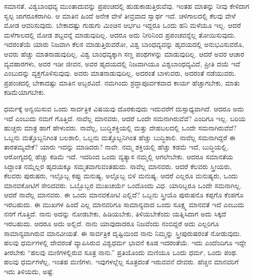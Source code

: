 \vskip 0.2cm

ಸಮಾನತೆ, ವಿಶ್ವಬಾಂಧವ್ಯ ಮುಂತಾದುವನ್ನು ಪ್ರಪಂಚದಲ್ಲಿ ಹುಡುಕಾಡುತ್ತಿರುವೆವು. ಇಂತಹ ಮಾತನ್ನು ನೀವು ಕೇಳಿದಾಗ ಸ್ವಲ್ಪ ಜಾಗರೂಕರಾಗಿರಿ. ಆ ಮಾತಿನ ಹಿಂದೆ ಅನೇಕ ವೇಳೆ ತೀವ್ರವಾದ ಸ್ವಾರ್ಥ ಇದೆ. ಚಳಿಗಾಲದಲ್ಲಿ ಕೆಲವು ವೇಳೆ ಮೋಡ ಆವರಿಸುವುದು. ಬೇಕಾದಷ್ಟು ಗುಡುಗು ಮಿಂಚಿನ ಆರ್ಭಟ ಇದ್ದರೂ ಒಂದು ಹನಿ ಮಳೆಯೂ ಇಲ್ಲ. ಆದರೆ ಮಳೆಗಾಲದಲ್ಲಿ ಮೋಡ ಶಬ್ದವನ್ನೆ ಮಾಡುವುದಿಲ್ಲ. ಆದರೂ ಅದು ನೀರಿನಿಂದ ಪ್ರಪಂಚವನ್ನೆಲ್ಲ ತೋಯಿಸುವುದು. ಇದರಂತೆಯೆ ಯಾರು ನಿಜವಾಗಿ ಕೆಲಸ ಮಾಡುತ್ತಿರುವರೋ, ವಿಶ್ವ ಬಾಂಧವ್ಯವನ್ನು ಹೃದಯದಲ್ಲಿ ಅನುಭವಿಸುವರೊ, ಅವರು ಹೆಚ್ಚು ಮಾತನಾಡುವುದಿಲ್ಲ. ವಿಶ್ವ ಬಾಂಧವ್ಯಕ್ಕಾಗಿ ಸಣ್ಣ ಪಂಥಗಳನ್ನು ಮಾಡುವುದಿಲ್ಲ. ಆದರೆ ಅವರ ಆಚಾರ ವ್ಯವಹಾರಗಳು, ಅವರ ಇಡೀ ಜೀವನ, ಅವರ ಹೃದಯದಲ್ಲಿ ನಿಜವಾಗಿಯೂ ವಿಶ್ವಬಾಂಧವ್ಯವಿದೆ, ಪ್ರೀತಿ ದಯೆ ಇವೆ ಎಂಬುದನ್ನು ವ್ಯಕ್ತಗೊಳಿಸುವುವು. ಅವರು ಮಾತನಾಡುವುದಿಲ್ಲ, ಅದರಂತೆ ಬಾಳುವರು, ಅದರಂತೆ ನಡೆಯುವರು. ಪ್ರಪಂಚದಲ್ಲಿ ಬೇಕಾದಷ್ಟು ಮಾತಿನ ಅಬ್ಬರವಿದೆ. ನಮಗಿಂದು ಶ್ರದ್ಧಾಪೂರ್ವಕವಾದ ಕಾರ್ಯ ಹೆಚ್ಚಾಗಬೇಕು, ಮಾತು ಕಡಿಮೆಯಾಗಬೇಕು.

\vskip 0.2cm

ಧರ್ಮಕ್ಕೆ ಅನ್ವಯಿಸುವ ಒಂದು ಸಾರ್ವತ್ರಿಕ ವಿಷಯವು ದೊರಕುವುದು ಇದುವರೆಗೆ ದುಸ್ಸಾಧ್ಯವಾಗಿದೆ. ಆದರೂ ಅದು ಇದೆ ಎಂಬುದು ನಮಗೆ ಗೊತ್ತಿದೆ. ನಾವೆಲ್ಲ ಮಾನವರು, ಆದರೆ ಒಂದೇ ಸಮನಾಗಿರುವೆವೆ? ಎಂದಿಗೂ ಇಲ್ಲ. ಬರಿಯ ಹುಚ್ಚರು ಮಾತ್ರ ಹಾಗೆ ಹೇಳುವರು. ನಾವೆಲ್ಲ, ಬುದ್ಧಿಶಕ್ತಿಯಲ್ಲಿ ಮತ್ತು ದೇಹಬಲದಲ್ಲಿ ಒಂದೇ ಸಮನಾಗಿರುವೆವೆ? ಒಬ್ಬನು ಮತ್ತೊಬ್ಬನಿಗಿಂತ ಬಲಶಾಲಿ, ಒಬ್ಬನು ಮತ್ತೊಬ್ಬನಿಗಿಂತ ಹೆಚ್ಚು ಬುದ್ಧಿಶಾಲಿ. ನಾವೆಲ್ಲ ಸಮನಾಗಿದ್ದರೆ ಈ ತಾರತಮ್ಯವೇಕೆ? ಯಾರು ಇದನ್ನು ಮಾಡಿದರು? ನಾವೇ. ನಮ್ಮ ಶಕ್ತಿಯಲ್ಲಿ ಹೆಚ್ಚು ಕಡಮೆ ಇದೆ, ಬುದ್ಧಿಯಲ್ಲಿ, ಆರೋಗ್ಯದಲ್ಲಿ ಹೆಚ್ಚು ಕಡಿಮೆ ಇದೆ. ಇದರಿಂದ ಒಂದು ವ್ಯತ್ಯಾಸ ನಮ್ಮಲ್ಲಿ ಆಗಲೇಬೇಕು. ಆದರೂ ಸಮಾನತೆಯ ಸಿದ್ಧಾಂತ ನಮ್ಮೆಲ್ಲರ ಹೃದಯಕ್ಕೂ ಸಮ್ಮತವಾಗುವಂತಹುದು. ನಾವೆಲ್ಲ ಮಾನವರು. ಆದರೆ ಕೆಲವರು ಸ್ತ್ರೀಯರು, ಕೆಲವರು ಪುರುಷರು, ಇಲ್ಲೊಬ್ಬ ಕಪ್ಪು ಮನುಷ್ಯ, ಅಲ್ಲೊಬ್ಬ ಬಿಳಿ ಮನುಷ್ಯ. ಆದರೆ ಎಲ್ಲರೂ ಮನುಷ್ಯರು, ಒಂದು ಮಾನವಕೋಟಿಗೆ ಸೇರಿದವರು. ಒಬ್ಬೊಬ್ಬರ ಮುಖಚರ್ಯೆ ಒಂದೊಂದು ವಿಧ. ಯಾರಿಬ್ಬರೂ ಒಂದೇ ಸಮನಾಗಿಲ್ಲ. ಆದರೆ ನಾವೆಲ್ಲ ಮಾನವರು. ಈ ಒಂದು ಮಾನವಕೋಟಿ ಎಲ್ಲಿದೆ? ಒಬ್ಬನು ಸ್ತ್ರೀಯೊ ಪುರುಷನೊ ಕಪ್ಪಗೊ ಕೆಂಪಗೊ ಇರಬಹುದು. ಈ ಮುಖಗಳ ಹಿಂದೆ ಎಲ್ಲ ಮಾನವರಿಗೂ ಸಾಮಾನ್ಯವಾದ ಒಂದು ಸೂಕ್ಷ್ಮ ಮಾನವತೆ ಇದೆ ಎಂಬುದು ನನಗೆ ಗೊತ್ತಿದೆ. ನಾನು ಅದನ್ನು ನೋಡಬೇಕು, ಹಿಡಿಯಬೇಕು, ತಿಳಿಯಬೇಕೆಂದು ಯತ್ನಿಸಿದಾಗ ಅದು ಸಿಕ್ಕದೆ ಇರಬಹುದು. ಆದರೂ ಅದು ಅಲ್ಲಿದೆ. ನಾನು ಯಾವುದಾದರೂ ನಿಜವೆಂದು ನಂಬಿದ್ದರೆ ಅದು ಎಲ್ಲರಿಗೂ ಸಾಮಾನ್ಯವಾಗಿರುವ ಮಾನವೀಯತೆ. ಈ ಸಾರ್ವತ್ರಿಕ ದೃಷ್ಟಿಯಿಂದ ನಾನು ನಿಮ್ಮನ್ನು ಸ್ತ್ರೀಪುರುಷರಂತೆ ನೋಡುವುದು. ಹಲವು ಧರ್ಮಗಳಲ್ಲಿ ದೇವರಂತೆ ವ್ಯಾಪಿಸಿರುವ ವಿಶ್ವಧರ್ಮ ಭಾವನೆ ಕೂಡ ಇದರಂತೆಯೆ. ಇದು ಎಂದೆಂದಿಗೂ ಇದ್ದೇ ತೀರಬೇಕು “ಹಲವು ಮಣಿಗಳಲ್ಲಿರುವ ಸೂತ್ರ ನಾನು.” ಪ್ರತಿಯೊಂದು ಮಣಿಯೂ ಒಂದು ಧರ್ಮ, ಒಂದು ಪಂಥ. ಹಲವು ಧರ್ಮಗಳೆಲ್ಲ, ಇಂತಹ ಮಣಿಗಳು. ಇವುಗಳಲ್ಲೆಲ್ಲ ಸೂತ್ರದಂತೆ ಇರುವವನೆ ದೇವರು. ಹೆಚ್ಚಿನ ಮಾನವರಿಗೆ ಇದು ತಿಳಿಯದು, ಅಷ್ಟೆ.

\vskip 5pt

